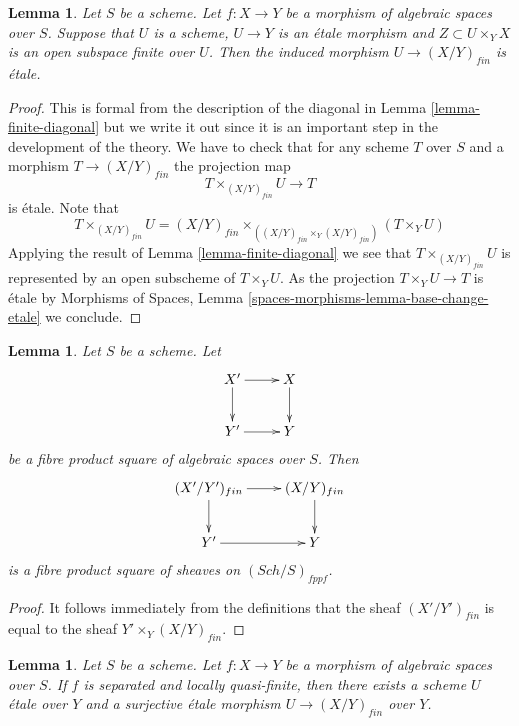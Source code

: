 \documentclass{stacks-project}
\theoremstyle{plain}
\newtheorem{lemma}[subsection]{Lemma}
\theoremstyle{definition}
\theoremstyle{remark}
\numberwithin{equation}{subsection}
\def\Sch{\mathit{Sch}}
\begin{document}
\begin{lemma}
\label{lemma-finite-criterion-etale}
Let $S$ be a scheme.
Let $f : X \to Y$ be a morphism of algebraic spaces over $S$.
Suppose that $U$ is a scheme, $U \to Y$ is an \'etale morphism and
$Z \subset U \times_Y X$ is an open subspace finite over $U$.
Then the induced morphism $U \to (X/Y)_{fin}$ is \'etale.
\end{lemma}

\begin{proof}
This is formal from the description of the diagonal in
Lemma \ref{lemma-finite-diagonal}
but we write it out since it is an important step in the development
of the theory. We have to check that for any scheme $T$ over $S$ and a morphism
$T \to (X/Y)_{fin}$ the projection map
$$
T \times_{(X/Y)_{fin}} U \longrightarrow T
$$
is \'etale. Note that
$$
T \times_{(X/Y)_{fin}} U
=
(X/Y)_{fin} \times_{((X/Y)_{fin} \times_Y (X/Y)_{fin})} (T \times_Y U)
$$
Applying the result of
Lemma \ref{lemma-finite-diagonal}
we see that $T \times_{(X/Y)_{fin}} U$ is represented by an open subscheme of
$T \times_Y U$. As the projection $T \times_Y U \to T$ is \'etale by
Morphisms of Spaces, Lemma \ref{spaces-morphisms-lemma-base-change-etale}
we conclude.
\end{proof}

\begin{lemma}
\label{lemma-finite-pullback}
Let $S$ be a scheme.
Let
$$
\xymatrix{
X' \ar[d] \ar[r] & X \ar[d] \\
Y' \ar[r] & Y
}
$$
be a fibre product square of algebraic spaces over $S$. Then
$$
\xymatrix{
(X'/Y')_{fin} \ar[d] \ar[r] & (X/Y)_{fin} \ar[d] \\
Y' \ar[r] & Y
}
$$
is a fibre product square of sheaves on $(\Sch/S)_{fppf}$.
\end{lemma}

\begin{proof}
It follows immediately from the definitions that
the sheaf $(X'/Y')_{fin}$ is equal to the sheaf
$Y' \times_Y (X/Y)_{fin}$.
\end{proof}

\begin{lemma}
\label{lemma-finite-surjective-etale-cover}
Let $S$ be a scheme.
Let $f : X \to Y$ be a morphism of algebraic spaces over $S$.
If $f$ is separated and locally quasi-finite, then there exists a
scheme $U$ \'etale over $Y$ and a surjective \'etale morphism
$U \to (X/Y)_{fin}$ over $Y$.
\end{lemma}
\end{document}
